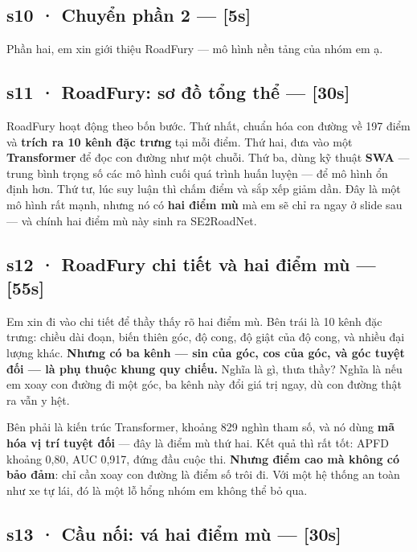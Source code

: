 \documentclass[
  11pt,
]{article}
\begin{document}
\subsection{s10 · Chuyển phần 2 ---
{[}5s{]}}\label{s10-chuyux1ec3n-phux1ea7n-2-5s}

Phần hai, em xin giới thiệu RoadFury --- mô hình nền tảng của nhóm em ạ.

\subsection{s11 · RoadFury: sơ đồ tổng thể ---
{[}30s{]}}\label{s11-roadfury-sux1a1-ux111ux1ed3-tux1ed5ng-thux1ec3-30s}

RoadFury hoạt động theo bốn bước. Thứ nhất, chuẩn hóa con đường về 197
điểm và \textbf{trích ra 10 kênh đặc trưng} tại mỗi điểm. Thứ hai, đưa
vào một \textbf{Transformer} để đọc con đường như một chuỗi. Thứ ba,
dùng kỹ thuật \textbf{SWA} --- trung bình trọng số các mô hình cuối quá
trình huấn luyện --- để mô hình ổn định hơn. Thứ tư, lúc suy luận thì
chấm điểm và sắp xếp giảm dần. Đây là một mô hình rất mạnh, nhưng nó có
\textbf{hai điểm mù} mà em sẽ chỉ ra ngay ở slide sau --- và chính hai
điểm mù này sinh ra SE2RoadNet.

\subsection{s12 · RoadFury chi tiết và hai điểm mù ---
{[}55s{]}}\label{s12-roadfury-chi-tiux1ebft-vuxe0-hai-ux111iux1ec3m-muxf9-55s}

Em xin đi vào chi tiết để thầy thấy rõ hai điểm mù. Bên trái là 10 kênh
đặc trưng: chiều dài đoạn, biến thiên góc, độ cong, độ giật của độ cong,
và nhiều đại lượng khác. \textbf{Nhưng có ba kênh --- sin của góc, cos
của góc, và góc tuyệt đối --- là phụ thuộc khung quy chiếu.} Nghĩa là
gì, thưa thầy? Nghĩa là nếu em xoay con đường đi một góc, ba kênh này
đổi giá trị ngay, dù con đường thật ra vẫn y hệt.

Bên phải là kiến trúc Transformer, khoảng 829 nghìn tham số, và nó dùng
\textbf{mã hóa vị trí tuyệt đối} --- đây là điểm mù thứ hai. Kết quả thì
rất tốt: APFD khoảng 0,80, AUC 0,917, đứng đầu cuộc thi. \textbf{Nhưng
điểm cao mà không có bảo đảm}: chỉ cần xoay con đường là điểm số trôi
đi. Với một hệ thống an toàn như xe tự lái, đó là một lỗ hổng nhóm em
không thể bỏ qua.

\subsection{s13 · Cầu nối: vá hai điểm mù ---
{[}30s{]}}\label{s13-cux1ea7u-nux1ed1i-vuxe1-hai-ux111iux1ec3m-muxf9-30s}
\end{document}
